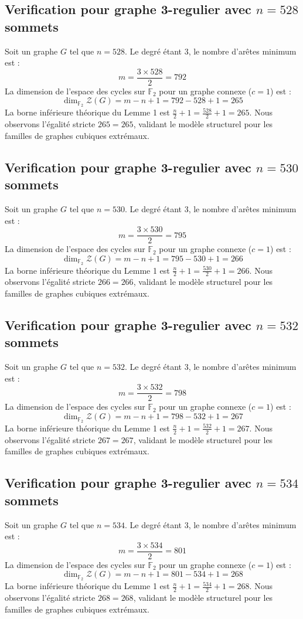 \documentclass[11pt,a4paper]{article}
\begin{document}
\subsection{Verification pour graphe 3-regulier avec $n=528$ sommets}
Soit un graphe $G$ tel que $n = 528$. Le degré étant 3, le nombre d'arêtes minimum est :
$$ m = \frac{3 \times 528}{2} = 792 $$
La dimension de l'espace des cycles sur $\mathbb{F}_2$ pour un graphe connexe ($c=1$) est :
$$ \dim_{\mathbb{F}_2} \mathcal{Z}(G) = m - n + 1 = 792 - 528 + 1 = 265 $$
La borne inférieure théorique du Lemme 1 est $\frac{n}{2} + 1 = \frac{528}{2} + 1 = 265$.
Nous observons l'égalité stricte $265 = 265$, validant le modèle structurel pour les familles de graphes cubiques extrémaux.

\subsection{Verification pour graphe 3-regulier avec $n=530$ sommets}
Soit un graphe $G$ tel que $n = 530$. Le degré étant 3, le nombre d'arêtes minimum est :
$$ m = \frac{3 \times 530}{2} = 795 $$
La dimension de l'espace des cycles sur $\mathbb{F}_2$ pour un graphe connexe ($c=1$) est :
$$ \dim_{\mathbb{F}_2} \mathcal{Z}(G) = m - n + 1 = 795 - 530 + 1 = 266 $$
La borne inférieure théorique du Lemme 1 est $\frac{n}{2} + 1 = \frac{530}{2} + 1 = 266$.
Nous observons l'égalité stricte $266 = 266$, validant le modèle structurel pour les familles de graphes cubiques extrémaux.

\subsection{Verification pour graphe 3-regulier avec $n=532$ sommets}
Soit un graphe $G$ tel que $n = 532$. Le degré étant 3, le nombre d'arêtes minimum est :
$$ m = \frac{3 \times 532}{2} = 798 $$
La dimension de l'espace des cycles sur $\mathbb{F}_2$ pour un graphe connexe ($c=1$) est :
$$ \dim_{\mathbb{F}_2} \mathcal{Z}(G) = m - n + 1 = 798 - 532 + 1 = 267 $$
La borne inférieure théorique du Lemme 1 est $\frac{n}{2} + 1 = \frac{532}{2} + 1 = 267$.
Nous observons l'égalité stricte $267 = 267$, validant le modèle structurel pour les familles de graphes cubiques extrémaux.

\subsection{Verification pour graphe 3-regulier avec $n=534$ sommets}
Soit un graphe $G$ tel que $n = 534$. Le degré étant 3, le nombre d'arêtes minimum est :
$$ m = \frac{3 \times 534}{2} = 801 $$
La dimension de l'espace des cycles sur $\mathbb{F}_2$ pour un graphe connexe ($c=1$) est :
$$ \dim_{\mathbb{F}_2} \mathcal{Z}(G) = m - n + 1 = 801 - 534 + 1 = 268 $$
La borne inférieure théorique du Lemme 1 est $\frac{n}{2} + 1 = \frac{534}{2} + 1 = 268$.
Nous observons l'égalité stricte $268 = 268$, validant le modèle structurel pour les familles de graphes cubiques extrémaux.
\end{document}
